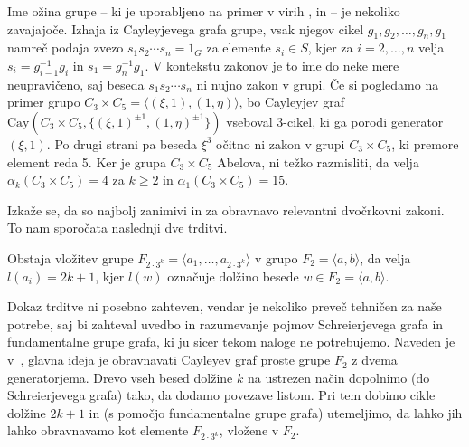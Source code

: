 \begin{opomba} %
Ime ožina grupe -- ki je uporabljeno na primer v virih \cite{Schneider_2016}, \cite{Bradford_Thom_2017} in \cite{Schleimer_2001} -- je nekoliko zavajajoče. Izhaja iz Cayleyjevega grafa grupe, vsak njegov cikel $g_1 , g_2, \ldots, g_n, g_1$ namreč
podaja zvezo $s_1 s_2 \cdots s_n = 1_G$ za elemente $s_i \in S$, kjer za $i = 2, \ldots, n$ velja $s_i = g_{i - 1}^{-1} g_i$ in $s_1 = g_n^{-1} g_1$.
V kontekstu zakonov je to ime do neke mere neupravičeno, saj beseda $s_1 s_2 \cdots s_n$ ni nujno zakon v grupi. Če si pogledamo na primer grupo $C_3 \times C_5 = \langle (\xi, 1), (1, \eta) \rangle$,
bo Cayleyjev graf $\text{Cay}(C_3 \times C_5, \{ (\xi, 1)^{\pm 1} , (1, \eta)^{\pm 1} \})$ vseboval 3-cikel, ki ga porodi generator $(\xi , 1)$. Po drugi strani pa beseda $\xi^3$ očitno ni zakon v grupi $C_3 \times C_5$, ki premore element reda 5.
Ker je grupa $C_3 \times C_5$ Abelova, ni težko razmisliti, da velja $\alpha_k(C_3 \times C_5) = 4$ za $k \ge 2$ in $\alpha_1(C_3 \times C_5) = 15$. 

\end{opomba}

Izkaže se, da so najbolj zanimivi in za obravnavo relevantni dvočrkovni zakoni. To nam sporočata naslednji dve trditvi.
\begin{trditev}
\label{trd_vlozitev_proste_grupe}
 Obstaja vložitev grupe $F_{2 \cdot 3^{k}} = \langle a_1, \ldots, a_{2 \cdot 3^{k}} \rangle$ v grupo $F_2 = \langle a,b \rangle $, da velja $l(a_i) = 2k + 1$, kjer $l(w)$ označuje dolžino besede $w \in F_2 = \langle a,b \rangle$. 
\end{trditev}


\begin{dokaz}
Dokaz trditve ni posebno zahteven, vendar je nekoliko preveč tehničen za naše potrebe, saj bi zahteval uvedbo in razumevanje pojmov Schreierjevega grafa in fundamentalne grupe grafa, ki ju sicer tekom naloge ne potrebujemo. Naveden je v~\cite[str.~5]{Schneider_2016}, glavna ideja je obravnavati Cayleyev graf proste grupe $F_2$ z dvema generatorjema.
Drevo vseh besed dolžine $k$ na ustrezen način dopolnimo (do Schreierjevega grafa) tako, da dodamo povezave listom. Pri tem dobimo cikle dolžine $2k + 1$ in (s pomočjo fundamentalne grupe grafa) utemeljimo, da lahko jih lahko obravnavamo kot elemente $F_{2 \cdot 3^{k}}$, vložene v $F_2$. 
\end{dokaz}


